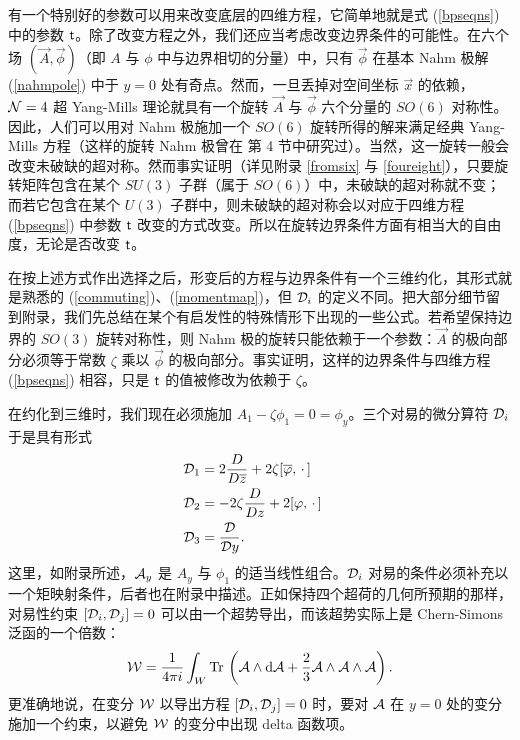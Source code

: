 有一个特别好的参数可以用来改变底层的四维方程，它简单地就是式 (\ref{bpseqns}) 中的参数 ${ \sf t}$。除了改变方程之外，我们还应当考虑改变边界条件的可能性。在六个场 $(\vec A,\vec\phi)$（即 $A$ 与 $\phi$ 中与边界相切的分量）中，只有 $\vec\phi$ 在基本 Nahm 极解 (\ref{nahmpole}) 中于 $y=0$ 处有奇点。然而，一旦丢掉对空间坐标 $\vec x$ 的依赖，${\mathcal N}=4$ 超 Yang-Mills 理论就具有一个旋转 $\vec A$ 与 $\vec \phi$ 六个分量的 $SO(6)$ 对称性。因此，人们可以用对 Nahm 极施加一个 $SO(6)$ 旋转所得的解来满足经典 Yang-Mills 方程（这样的旋转 Nahm 极曾在 \cite{gw} 第 4 节中研究过）。当然，这一旋转一般会改变未破缺的超对称。然而事实证明（详见附录 \ref{fromsix} 与 \ref{foureight}），只要旋转矩阵包含在某个 $SU(3)$ 子群（属于 $SO(6)$）中，未破缺的超对称就不变；而若它包含在某个 $U(3)$ 子群中，则未破缺的超对称会以对应于四维方程 (\ref{bpseqns}) 中参数 ${ \sf t}$ 改变的方式改变。所以在旋转边界条件方面有相当大的自由度，无论是否改变 ${ \sf t}$。

在按上述方式作出选择之后，形变后的方程与边界条件有一个三维约化，其形式就是熟悉的 (\ref{commuting})、(\ref{momentmap})，但 ${\mathcal D}_i$ 的定义不同。把大部分细节留到附录，我们先总结在某个有启发性的特殊情形下出现的一些公式。若希望保持边界的 $SO(3)$ 旋转对称性，则 Nahm 极的旋转只能依赖于一个参数：$\vec A$ 的极向部分必须等于常数 $\zeta$ 乘以 $\vec\phi$ 的极向部分。事实证明，这样的边界条件与四维方程 (\ref{bpseqns}) 相容，只是 ${ \sf t}$ 的值被修改为依赖于 $\zeta$。

在约化到三维时，我们现在必须施加 $A_1-\zeta\phi_1=0=\phi_y$。三个对易的微分算符 ${\mathcal D}_i$ 于是具有形式
\begin{align}\label{neqformo}{\mathcal D}_1 & =2\frac{D}{D\overline z}  +2 \zeta [\overline \varphi,\,\cdot\,] \cr
                                                              {\mathcal D}_2 & = - 2 \zeta \frac{D}{D z} + 2[\varphi,\,\cdot\,]\cr
                                                               {\mathcal D}_3& = \frac{{\mathcal D}}{{\mathcal D} y}. \end{align}
这里，如附录所述，${\mathcal A}_y$ 是 $A_y$ 与 $\phi_1$ 的适当线性组合。${\mathcal D}_i$ 对易的条件必须补充以一个矩映射条件，后者也在附录中描述。正如保持四个超荷的几何所预期的那样，对易性约束 $[{\mathcal D}_i,{\mathcal D}_j]=0$ 可以由一个超势导出，而该超势实际上是 Chern-Simons 泛函的一个倍数：
\begin{equation}\label{supertwo}{\mathcal W}=\frac{1}{4\pi i}\int_{W}{\mathrm {Tr}}\,\left({\mathcal A}\wedge{\mathrm d} {\mathcal A}+\frac{2}{3}{\mathcal A}\wedge
{\mathcal A}\wedge{\mathcal A}\right).\end{equation}
更准确地说，在变分 ${\mathcal W}$ 以导出方程 $[{\mathcal D}_i,{\mathcal D}_j]=0$ 时，要对 ${\mathcal A}$ 在 $y=0$ 处的变分施加一个约束，以避免 ${\mathcal W}$ 的变分中出现 delta 函数项。

